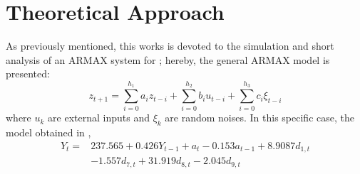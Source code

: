 \section{Theoretical Approach}\label{sec:theo}
As previously mentioned, this works is devoted to the simulation and short analysis of an ARMAX system for ; hereby, the general ARMAX model is presented:
\begin{equation}
    z_{t+1}=\sum_{i=0}^{h_1}a_iz_{t-i}+\sum_{i=0}^{h_2}b_iu_{t-i}+\sum_{i=0}^{h_3}c_i\xi_{t-i}
\end{equation}
where $u_k$ are external inputs and $\xi_k$ are random noises. In this specific case, the model obtained in \cite{li2014armax}, 
\begin{equation}
\begin{aligned} Y_{t}=& 237.565+0.426 Y_{t-1}+a_{t}-0.153 a_{t-1}+8.9087 d_{1, t} \\ &-1.557 d_{7, t}+31.919 d_{8, t}-2.045 d_{9, t} \end{aligned}
\end{equation}